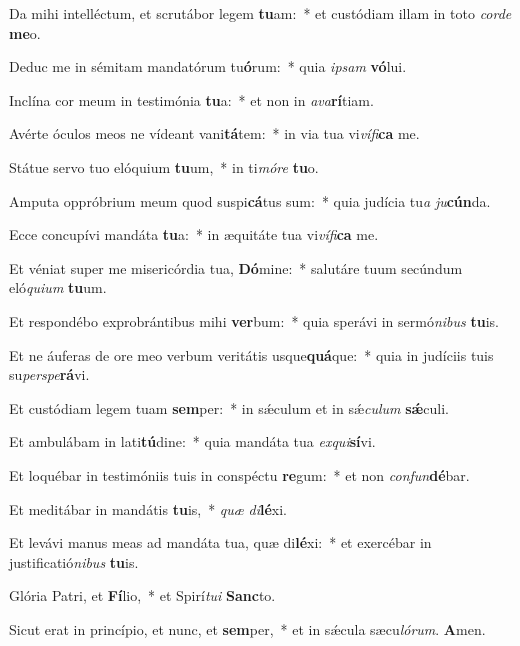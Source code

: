 ﻿\item Da mihi intelléctum, et scrutábor legem \textbf{tu}am:~* et custódiam illam in toto \emph{cor}\emph{de} \textbf{me}o.

\item Deduc me in sémitam mandatórum tu\textbf{ó}rum:~* quia \emph{ip}\emph{sam} \textbf{vó}lui.

\item Inclína cor meum in testimónia \textbf{tu}a:~* et non in \emph{a}\emph{va}\textbf{rí}tiam.

\item Avérte óculos meos ne vídeant vani\textbf{tá}tem:~* in via tua vi\emph{ví}\emph{fi}\textbf{ca} me.

\item Státue servo tuo elóquium \textbf{tu}um,~* in ti\emph{mó}\emph{re} \textbf{tu}o.

\item Amputa oppróbrium meum quod suspi\textbf{cá}tus sum:~* quia judícia tu\emph{a} \emph{ju}\textbf{cún}da.

\item Ecce concupívi mandáta \textbf{tu}a:~* in æquitáte tua vi\emph{ví}\emph{fi}\textbf{ca} me.

\item Et véniat super me misericórdia tua, \textbf{Dó}mine:~* salutáre tuum secúndum eló\emph{qui}\emph{um} \textbf{tu}um.

\item Et respondébo exprobrántibus mihi \textbf{ver}bum:~* quia sperávi in sermó\emph{ni}\emph{bus} \textbf{tu}is.

\item Et ne áuferas de ore meo verbum veritátis usque\textbf{quá}que:~* quia in judíciis tuis su\emph{per}\emph{spe}\textbf{rá}vi.

\item Et custódiam legem tuam \textbf{sem}per:~* in sǽculum et in sǽ\emph{cu}\emph{lum} \textbf{sǽ}culi.

\item Et ambulábam in lati\textbf{tú}dine:~* quia mandáta tua \emph{ex}\emph{qui}\textbf{sí}vi.

\item Et loquébar in testimóniis tuis in conspéctu \textbf{re}gum:~* et non \emph{con}\emph{fun}\textbf{dé}bar.

\item Et meditábar in mandátis \textbf{tu}is,~* \emph{quæ} \emph{di}\textbf{lé}xi.

\item Et levávi manus meas ad mandáta tua, quæ di\textbf{lé}xi:~* et exercébar in justificatió\emph{ni}\emph{bus} \textbf{tu}is.

\item Glória Patri, et \textbf{Fí}lio,~* et Spirí\emph{tu}\emph{i} \textbf{Sanc}to.

\item Sicut erat in princípio, et nunc, et \textbf{sem}per,~* et in sǽcula sæcu\emph{ló}\emph{rum}. \textbf{A}men.